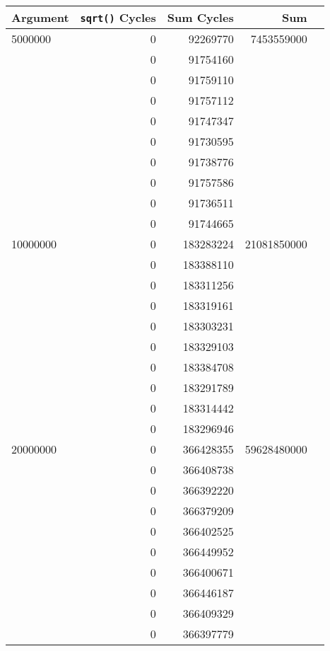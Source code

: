 \begin{tabular}{lrrrr}
\toprule
 Argument & \texttt{sqrt()} Cycles & Sum Cycles & Sum \\
\midrule
  5000000 &            0 &    92269770 &   7453559000 \\
          &            0 &    91754160 &              \\
          &            0 &    91759110 &              \\
          &            0 &    91757112 &              \\
          &            0 &    91747347 &              \\
          &            0 &    91730595 &              \\
          &            0 &    91738776 &              \\
          &            0 &    91757586 &              \\
          &            0 &    91736511 &              \\
          &            0 &    91744665 &              \\
\midrule
 10000000 &            0 &   183283224 &  21081850000 \\
          &            0 &   183388110 &              \\
          &            0 &   183311256 &              \\
          &            0 &   183319161 &              \\
          &            0 &   183303231 &              \\
          &            0 &   183329103 &              \\
          &            0 &   183384708 &              \\
          &            0 &   183291789 &              \\
          &            0 &   183314442 &              \\
          &            0 &   183296946 &              \\
\midrule
 20000000 &            0 &   366428355 &  59628480000 \\
          &            0 &   366408738 &              \\
          &            0 &   366392220 &              \\
          &            0 &   366379209 &              \\
          &            0 &   366402525 &              \\
          &            0 &   366449952 &              \\
          &            0 &   366400671 &              \\
          &            0 &   366446187 &              \\
          &            0 &   366409329 &              \\
          &            0 &   366397779 &              \\
\bottomrule
\end{tabular}
